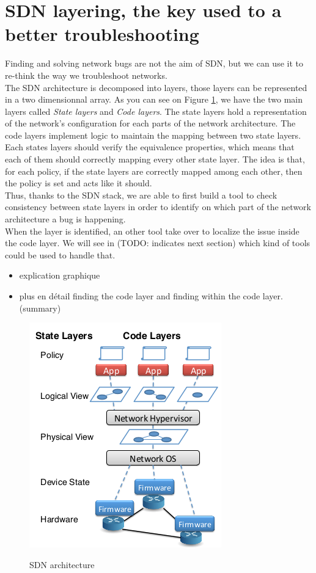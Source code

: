\documentclass[10pt,article]{IEEEtran}
\begin{document}
\section{SDN layering, the key used to a better troubleshooting}
Finding and solving network bugs are not the aim of SDN, but we can use it to re-think the way we troubleshoot networks.\\ The SDN architecture is decomposed into  layers, those layers can be represented in a two dimensionnal array. As you can see on Figure \ref{layers}, we have the two main layers called \textit{State layers} and \textit{Code layers}. The state layers hold a representation of the network's configuration for each parts of the network architecture. The code layers implement logic to maintain the mapping between two state layers. Each states layers should verify the equivalence properties, which means that each of them should correctly mapping every other state layer. The idea is that, for each policy, if the state layers are correctly mapped among each other, then the policy is  set and acts like it should.\\
Thus, thanks to the SDN stack, we are able to first build a tool to check consistency between state layers in order to identify on which part of the network architecture a bug is happening. \\
When the layer is identified, an other tool take over to localize the issue inside the code layer. We will see in (TODO: indicates next section) which kind of tools could be used to handle that.
\begin{itemize}
\item explication graphique
\item plus en détail finding the code layer and finding within the code layer. (summary)
\end{itemize}
\begin{figure}
\includegraphics[scale=0.65]{layers.png}
\label{layers}
\caption{SDN architecture}
\end{figure}
\end{document}
